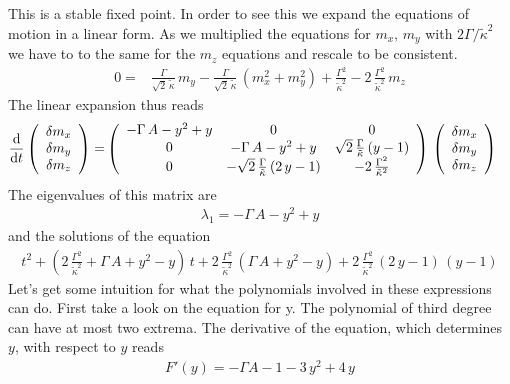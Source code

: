 \documentclass{article}
\begin{document}
This is a stable fixed point. In order to see this we expand the equations of motion in a linear form. As we multiplied the equations for $m_x,\,m_y$ with $2\Gamma/\tilde{\kappa}^2$ we have to to the same for the $m_z$ equations and rescale to be consistent. 
\begin{align*}
    0=&\frac{\Gamma}{\sqrt{2}\,\tilde{\kappa}}\,m_y  - \frac{\Gamma}{\sqrt{2}\,\tilde{\kappa}}\,(m_x^2+ m_y^2)+\frac{\Gamma^2}{\tilde{\kappa}^2}-2\,\frac{\Gamma^2}{\tilde{\kappa}^2}\,m_z
\end{align*}
The linear expansion thus reads
\begin{align*}
    \frac{\text{d}}{\text{d}t}\left(\begin{array}{c}
         \delta m_x\\
         \delta m_y\\
         \delta m_z
    \end{array}\right)=&\left( \begin{array}{ccc}
        -\Gamma\,A-y^2+y&  0 & 0\\
        0 & -\Gamma\,A-y^2+y & \sqrt{2}\,\frac{\Gamma}{\tilde{\kappa}}\,(y-1)\\
        0 &  -\sqrt{2}\,\frac{\Gamma}{\tilde{\kappa}}\,(2\,y-1) & -2\,\frac{\Gamma^2}{\tilde{\kappa}^2}
    \end{array} \right)\,\left(\begin{array}{c}
         \delta m_x\\
         \delta m_y\\
         \delta m_z
    \end{array}\right)
\end{align*}
The eigenvalues of this matrix are
\begin{align*}
     \lambda_1=-\Gamma\,A-y^2+y
\end{align*}
and the solutions of the equation
\begin{align*}
    t^2+\left( 2\,\frac{\Gamma^2}{\tilde{\kappa}^2}+\Gamma\,A+y^2-y  \right)\,t+2\,\frac{\Gamma^2}{\tilde{\kappa}^2}\,\left( \Gamma\,A+y^2-y   \right)+2\,\frac{\Gamma^2}{\tilde{\kappa}^2}\,(2\,y-1)\,(y-1)
\end{align*}
Let's get some intuition for what the polynomials involved in these expressions can do. First take a look on the equation for y. The polynomial of third degree can have at most two extrema. The derivative of the equation, which determines $y$, with respect to $y$ reads
\begin{align*}
    F'(y)=-\Gamma A-1 -3\,y^2+4\,y
\end{align*}
\end{document}
